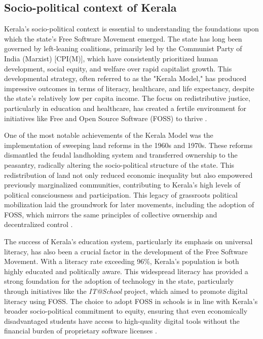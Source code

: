 \begin{refsection}
\subsection{Socio-political context of Kerala}

Kerala's socio-political context is essential to understanding the foundations upon which the state's Free Software Movement emerged. The state has long been governed by left-leaning coalitions, primarily led by the Communist Party of India (Marxist) [CPI(M)], which have consistently prioritized human development, social equity, and welfare over rapid capitalist growth. This developmental strategy, often referred to as the "Kerala Model," has produced impressive outcomes in terms of literacy, healthcare, and life expectancy, despite the state's relatively low per capita income. The focus on redistributive justice, particularly in education and healthcare, has created a fertile environment for initiatives like Free and Open Source Software (FOSS) to thrive \cite[pp.~91-96]{ramachandran1997keraladev}.

One of the most notable achievements of the Kerala Model was the implementation of sweeping land reforms in the 1960s and 1970s. These reforms dismantled the feudal landholding system and transferred ownership to the peasantry, radically altering the socio-political structure of the state. This redistribution of land not only reduced economic inequality but also empowered previously marginalized communities, contributing to Kerala's high levels of political consciousness and participation. This legacy of grassroots political mobilization laid the groundwork for later movements, including the adoption of FOSS, which mirrors the same principles of collective ownership and decentralized control \cite[pp.~62-65]{heller2018development}.

The success of Kerala's education system, particularly its emphasis on universal literacy, has also been a crucial factor in the development of the Free Software Movement. With a literacy rate exceeding 96\%, Kerala's population is both highly educated and politically aware. This widespread literacy has provided a strong foundation for the adoption of technology in the state, particularly through initiatives like the \textit{IT@School} project, which aimed to promote digital literacy using FOSS. The choice to adopt FOSS in schools is in line with Kerala's broader socio-political commitment to equity, ensuring that even economically disadvantaged students have access to high-quality digital tools without the financial burden of proprietary software licenses \cite{kurup2020freedom}.


\end{refsection}
